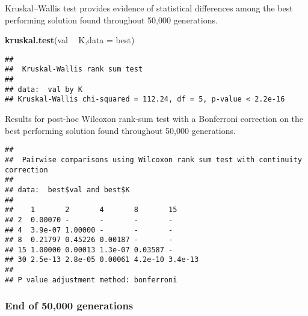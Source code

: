 \documentclass[]{book}
\newenvironment{Shaded}{\begin{snugshade}}{\end{snugshade}}
\newcommand{\DataTypeTok}[1]{\textcolor[rgb]{0.13,0.29,0.53}{#1}}
\newcommand{\KeywordTok}[1]{\textcolor[rgb]{0.13,0.29,0.53}{\textbf{#1}}}
\newcommand{\NormalTok}[1]{#1}
\newcommand{\OperatorTok}[1]{\textcolor[rgb]{0.81,0.36,0.00}{\textbf{#1}}}
\newcommand{\OtherTok}[1]{\textcolor[rgb]{0.56,0.35,0.01}{#1}}
\newcommand{\StringTok}[1]{\textcolor[rgb]{0.31,0.60,0.02}{#1}}
\begin{document}
Kruskal--Wallis test provides evidence of statistical differences among the best performing solution found throughout 50,000 generations.

\begin{Shaded}
\begin{Highlighting}[]
\KeywordTok{kruskal.test}\NormalTok{(val }\OperatorTok{~}\StringTok{ }\NormalTok{K,}\DataTypeTok{data =}\NormalTok{ best)}
\end{Highlighting}
\end{Shaded}

\begin{verbatim}
## 
##  Kruskal-Wallis rank sum test
## 
## data:  val by K
## Kruskal-Wallis chi-squared = 112.24, df = 5, p-value < 2.2e-16
\end{verbatim}

Results for post-hoc Wilcoxon rank-sum test with a Bonferroni correction on the best performing solution found throughout 50,000 generations.

\begin{Shaded}
\end{Shaded}

\begin{verbatim}
## 
##  Pairwise comparisons using Wilcoxon rank sum test with continuity correction 
## 
## data:  best$val and best$K 
## 
##    1       2       4       8       15     
## 2  0.00070 -       -       -       -      
## 4  3.9e-07 1.00000 -       -       -      
## 8  0.21797 0.45226 0.00187 -       -      
## 15 1.00000 0.00013 1.3e-07 0.03587 -      
## 30 2.5e-13 2.8e-05 0.00061 4.2e-10 3.4e-13
## 
## P value adjustment method: bonferroni
\end{verbatim}

\hypertarget{end-of-50000-generations-40}{%
\subsubsection{End of 50,000 generations}\label{end-of-50000-generations-40}}
\end{document}
